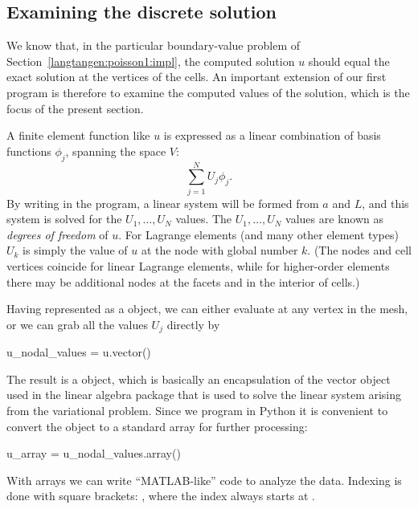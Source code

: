 \subsection{Examining the discrete solution}
\label{langtangen:poisson1:verify1}

We know that, in the particular boundary-value problem of
Section~\ref{langtangen:poisson1:impl}, the computed solution $u$ should
equal the exact solution at the vertices of the cells.  An important
extension of our first program is therefore to examine the computed
values of the solution, which is the focus of the present section.

A finite element function like $u$ is expressed as a linear combination
of basis functions $\phi_j$, spanning the space $V$:
\begin{equation}
  \sum_{j=1}^N U_j \phi_j.
\label{langtangen:poisson1:ufem}
\end{equation}
By writing  in the program, a linear system
will be formed from $a$ and $L$, and this system is solved for
the $U_1,\ldots,U_N$ values. The $U_1,\ldots,U_N$ values are known
 as \emph{degrees of freedom} of $u$. For
Lagrange elements (and many other element types) $U_k$ is simply the value
of $u$ at the node with global number $k$.  (The nodes and cell vertices
coincide for linear Lagrange elements, while for higher-order elements
there may be additional nodes at the facets and in the interior of cells.)

Having  represented as a  object, we can either
evaluate  at any vertex  in the mesh, or we can grab
all the values $U_j$ directly by
\begin{python}
u_nodal_values = u.vector()
\end{python}
The result is a \dolfin{}  object, which is basically an
encapsulation of the vector object used in the linear algebra package
that is used to solve the linear system arising from the variational
problem.  Since we program in Python it is convenient to convert
the  object to a standard  array for further
processing:
\begin{python}
u_array = u_nodal_values.array()
\end{python}
With  arrays we can write ``MATLAB-like'' code to analyze
the data. Indexing is done with square brackets: ,
where the index  always starts at .

